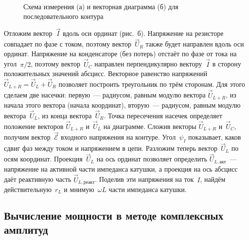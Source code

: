 \begin{figure}[h]
	\begin{minipage}[h]{0.49\linewidth}
		\centering\small
	\end{minipage}
	\hfill
	\begin{minipage}[h]{0.49\linewidth}
		\centering\small
	\end{minipage}
	\caption{Схема измерения (а) и векторная  диаграмма (б) для
последовательного контура}
\end{figure}

Отложим вектор~$\vec I$ вдоль оси ординат (рис.~б). Напряжение на
резисторе совпадает по фазе с током, поэтому вектор~$\vec U_R$ также будет
направлен вдоль оси ординат. Напряжение на конденсаторе (без потерь) отстаёт по
фазе от тока на угол~$\pi/2$, поэтому вектор~$\vec{U}_{\! C}$ направлен
перпендикулярно вектору~$\vec I$ в сторону положительных значений абсцисс.
Векторное равенство напряжений $\vec U_{L+R}=\vec U_L+\vec U_R$ позволяет
построить треугольник по трём сторонам. Для этого сделаем две насечки:
первую~--- радиусом, равным модулю вектора $\vec U_{L+R}$, из начала этого
вектора (начала координат), вторую~--- радиусом, равным модулю вектора~$\vec
U_L$, из конца вектора~$\vec U_R$. Точка пересечения насечек определяет
положение векторов $\vec U_{L+R}$ и~$\vec U_L$ на диаграмме. Сложив векторы
$\vec{U}_{L+R}$ и~$\vec{U}_{\! C}$, получим вектор~$\vec{\mathcal{E}}$ входного
напряжения на контуре. Угол~$\psi_I$ показывает, каков сдвиг фаз между током и
напряжением в цепи. Разложим теперь вектор~$\vec U_L$ по осям координат.
Проекция~$\vec U_L$ на ось ординат позволяет определить $\vec
U_{L,\text{акт}}$~--- напряжение на активной части импеданса катушки, а проекция
на ось абсцисс даёт реактивную часть $\vec U_{L,\text{реакт}}$. Поделив эти
напряжения на ток~$I$, найдём действительную~$r_L$ и мнимую~$\omega L$ части
импеданса катушки.

\subsection[Вычисление мощности в методе комплексных\\ амплитуд]%
{Вычисление мощности в методе комплексных амплитуд}

